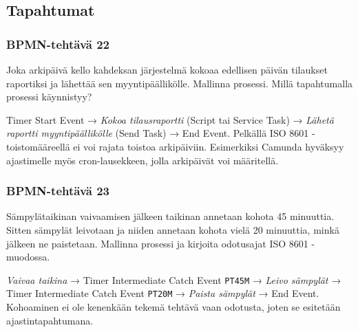 \documentclass[
  finnish,
  letterpaper,
  DIV=11,
  numbers=noendperiod,
  oneside]{scrreprt}
\begin{document}
\subsection{Tapahtumat}\label{tapahtumat-1}

\subsubsection{BPMN-tehtävä 22}\label{bpmn-tehtuxe4vuxe4-22}

Joka arkipäivä kello kahdeksan järjestelmä kokoaa edellisen päivän
tilaukset raportiksi ja lähettää sen myyntipäällikölle. Mallinna
prosessi. Millä tapahtumalla prosessi käynnistyy?

\begin{tcolorbox}[enhanced jigsaw, arc=.35mm, bottomrule=.15mm, bottomtitle=1mm, breakable, colback=white, colbacktitle=quarto-callout-tip-color!10!white, colframe=quarto-callout-tip-color-frame, coltitle=black, left=2mm, leftrule=.75mm, opacityback=0, opacitybacktitle=0.6, rightrule=.15mm, title=\textcolor{quarto-callout-tip-color}{\faLightbulb}\hspace{0.5em}{Malliratkaisu}, titlerule=0mm, toprule=.15mm, toptitle=1mm]

Timer Start Event → \emph{Kokoa tilausraportti} (Script tai Service
Task) → \emph{Lähetä raportti myyntipäällikölle} (Send Task) → End
Event. Pelkällä ISO 8601 -toistomääreellä ei voi rajata toistoa
arkipäiviin. Esimerkiksi Camunda hyväksyy ajastimelle myös
cron-lausekkeen, jolla arkipäivät voi määritellä.

\end{tcolorbox}

\subsubsection{BPMN-tehtävä 23}\label{bpmn-tehtuxe4vuxe4-23}

Sämpylätaikinan vaivaamisen jälkeen taikinan annetaan kohota 45
minuuttia. Sitten sämpylät leivotaan ja niiden annetaan kohota vielä 20
minuuttia, minkä jälkeen ne paistetaan. Mallinna prosessi ja kirjoita
odotusajat ISO 8601 -muodossa.

\begin{tcolorbox}[enhanced jigsaw, arc=.35mm, bottomrule=.15mm, bottomtitle=1mm, breakable, colback=white, colbacktitle=quarto-callout-tip-color!10!white, colframe=quarto-callout-tip-color-frame, coltitle=black, left=2mm, leftrule=.75mm, opacityback=0, opacitybacktitle=0.6, rightrule=.15mm, title=\textcolor{quarto-callout-tip-color}{\faLightbulb}\hspace{0.5em}{Malliratkaisu}, titlerule=0mm, toprule=.15mm, toptitle=1mm]

\emph{Vaivaa taikina} → Timer Intermediate Catch Event \texttt{PT45M} →
\emph{Leivo sämpylät} → Timer Intermediate Catch Event \texttt{PT20M} →
\emph{Paista sämpylät} → End Event. Kohoaminen ei ole kenenkään tekemä
tehtävä vaan odotusta, joten se esitetään ajastintapahtumana.

\end{tcolorbox}
\end{document}
